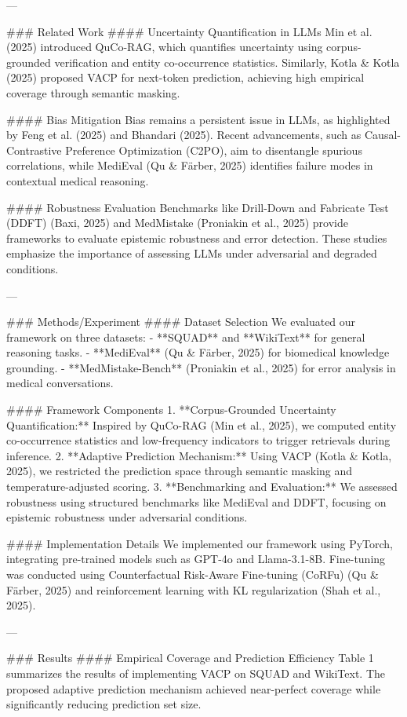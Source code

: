 ---

### Related Work  
#### Uncertainty Quantification in LLMs  
Min et al. (2025) introduced QuCo-RAG, which quantifies uncertainty using corpus-grounded verification and entity co-occurrence statistics. Similarly, Kotla & Kotla (2025) proposed VACP for next-token prediction, achieving high empirical coverage through semantic masking.  

#### Bias Mitigation  
Bias remains a persistent issue in LLMs, as highlighted by Feng et al. (2025) and Bhandari (2025). Recent advancements, such as Causal-Contrastive Preference Optimization (C2PO), aim to disentangle spurious correlations, while MediEval (Qu & Färber, 2025) identifies failure modes in contextual medical reasoning.  

#### Robustness Evaluation  
Benchmarks like Drill-Down and Fabricate Test (DDFT) (Baxi, 2025) and MedMistake (Proniakin et al., 2025) provide frameworks to evaluate epistemic robustness and error detection. These studies emphasize the importance of assessing LLMs under adversarial and degraded conditions.  

---

### Methods/Experiment  
#### Dataset Selection  
We evaluated our framework on three datasets:  
- **SQUAD** and **WikiText** for general reasoning tasks.  
- **MediEval** (Qu & Färber, 2025) for biomedical knowledge grounding.  
- **MedMistake-Bench** (Proniakin et al., 2025) for error analysis in medical conversations.  

#### Framework Components  
1. **Corpus-Grounded Uncertainty Quantification:** Inspired by QuCo-RAG (Min et al., 2025), we computed entity co-occurrence statistics and low-frequency indicators to trigger retrievals during inference.  
2. **Adaptive Prediction Mechanism:** Using VACP (Kotla & Kotla, 2025), we restricted the prediction space through semantic masking and temperature-adjusted scoring.  
3. **Benchmarking and Evaluation:** We assessed robustness using structured benchmarks like MediEval and DDFT, focusing on epistemic robustness under adversarial conditions.  

#### Implementation Details  
We implemented our framework using PyTorch, integrating pre-trained models such as GPT-4o and Llama-3.1-8B. Fine-tuning was conducted using Counterfactual Risk-Aware Fine-tuning (CoRFu) (Qu & Färber, 2025) and reinforcement learning with KL regularization (Shah et al., 2025).  

---

### Results  
#### Empirical Coverage and Prediction Efficiency  
Table 1 summarizes the results of implementing VACP on SQUAD and WikiText. The proposed adaptive prediction mechanism achieved near-perfect coverage while significantly reducing prediction set size.  

